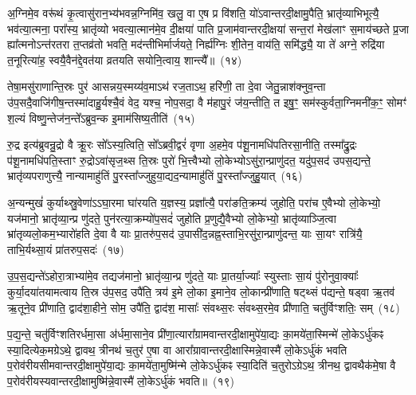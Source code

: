 अ॒ग्निमे॒व वरू॑थं कृ॒त्वासु॑रान॒भ्य॑भवन्न॒ग्निमि॑व॒ खलु॒ वा ए॒ष प्र वि॑शति॒ यो॑\-ऽवान्तरदी॒क्षामु॒पैति॒ भ्रातृ॑व्याभिभूत्यै॒ भव॑त्या॒त्मना॒ परा᳚स्य॒ भ्रातृ॑व्यो भवत्या॒त्मान॑मे॒व दी॒क्षया॑ पाति प्र॒जाम॑वान्तरदी॒क्षया॑ सन्त॒रां मेख॑लाꣳ स॒माय॑च्छते प्र॒जा ह्या᳚त्मनो\-ऽन्त॑रतरा त॒प्तव्र॑तो भवति॒ मद॑न्तीभिर्मार्जयते॒ निर्\mbox{}ह्य॑ग्निः शी॒तेन॒ वाय॑ति॒ समि॑द्ध्यै॒ या ते॑ अग्ने॒ रुद्रि॑या त॒नूरित्या॑ह॒ स्वयै॒वैन॑द्दे॒वत॑या व्रतयति सयोनि॒त्वाय॒ शान्त्यै᳚॥~(१४)\ip

{\anuvakamend[{यो वा ओज॑ आह॒ यद॑शी॒येति॒ ते᳚\-ऽग्न॒ एका॑\-दश च}]}

तेषा॒मसु॑राणान्ति॒स्रः पुर॑ आसन्नय॒स्मय्य॑व॒मा\-ऽथ॑ रज॒ता\-ऽथ॒ हरि॑णी॒ ता दे॒वा जेतु॒न्नाश॑क्नुव॒न्ता उ॑प॒सदै॒वाजि॑गीष॒न्तस्मा॑दाहु॒र्यश्चै॒वं वेद॒ यश्च॒ नोप॒सदा॒ वै म॑हापु॒रं ज॑य॒न्तीति॒ त इषु॒ꣳ॒ सम॑स्कुर्वता॒ग्निमनी॑क॒ꣳ॒ सोमꣳ॑ श॒ल्यं विष्णु॒न्तेज॑न॒न्ते᳚\-ऽब्रुव॒न्क इ॒माम॑सिष्य॒तीति॑~(१५)\ip

रु॒द्र इत्य॑ब्रुवन्रु॒द्रो वै क्रू॒रः सो᳚\-ऽस्य॒त्विति॒ सो᳚\-ऽब्रवी॒द्वरं॑ वृणा अ॒हमे॒व प॑शू॒नामधि॑\-पतिरसा॒नीति॒ तस्मा᳚द्\-रु॒द्रः प॑शू॒नामधि॑\-पति॒स्ताꣳ रु॒द्रो\-ऽवा॑सृज॒थ्स ति॒स्रः पुरो॑ भि॒त्त्वैभ्यो लो॒केभ्यो\-ऽसु॑रा॒न्प्राणु॑दत॒ यदु॑प॒सद॑ उपस॒द्यन्ते॒ भ्रातृ॑व्यपराणुत्त्यै॒ नान्यामाहु॑तिं पु॒रस्ता᳚ज्जुहुया॒द्यद॒न्यामाहु॑तिं पु॒रस्ता᳚ज्जुहु॒यात्~(१६)\ip

अ॒न्यन्मुखं॑ कुर्याथ्स्रु॒वेणा॑\-ऽऽघा॒रमा घा॑रयति य॒ज्ञस्य॒ प्रज्ञा᳚त्यै॒ परा॑ङति॒क्रम्य॑ जुहोति॒ परा॑च ए॒वैभ्यो लो॒केभ्यो॒ यज॑मानो॒ भ्रातृ॑व्या॒न्प्र णु॑दते॒ पुन॑रत्या॒क्रम्यो॑प॒सदं॑ जुहोति प्र॒णुद्यै॒वैभ्यो लो॒केभ्यो॒ भ्रातृ॑व्याञ्जि॒त्वा भ्रा॑तृव्यलो॒कम॒भ्यारो॑हति दे॒वा वै याः प्रा॒तरु॑प॒सद॑ उ॒पासी॑द॒न्नह्न॒स्ताभि॒रसु॑रा॒न्प्राणु॑दन्त॒ याः सा॒यꣳ रात्रि॑यै॒ ताभि॒र्यथ्सा॒यं प्रा॑तरुप॒सदः॑~(१७)\ip

उ॒प॒स॒द्यन्ते॑\-ऽहोरा॒त्राभ्या॑मे॒व तद्यज॑मानो॒ भ्रातृ॑व्या॒न्प्र णु॑दते॒ याः प्रा॒तर्या॒ज्याः᳚ स्युस्ताः सा॒यं पु॑रोनुवा॒क्याः᳚ कुर्या॒दया॑तयामत्वाय ति॒स्र उ॑प॒सद॒ उपै॑ति॒ त्रय॑ इ॒मे लो॒का इ॒माने॒व लो॒कान्प्री॑णाति॒ षट्थ्सं प॑द्यन्ते॒ षड्वा ऋ॒तव॑ ऋ॒तूने॒व प्री॑णाति॒ द्वाद॑शा॒हीने॒ सोम॒ उपै॑ति॒ द्वाद॑श॒ मासाः᳚ संवथ्स॒रः सं॑वथ्स॒रमे॒व प्री॑णाति॒ चतु॑र्विꣳशतिः॒ सम्~(१८)\ip

प॒द्य॒न्ते॒ चतु॑र्विꣳशतिरर्धमा॒सा अ॑र्धमा॒साने॒व प्री॑णा॒त्यारा᳚ग्रामवान्तरदी॒क्षामुपे॑या॒द्यः का॒मये॑ता॒स्मिन्मे॑ लो॒के\-ऽर्धु॑कꣴ स्या॒दित्येक॒मग्रे\-ऽथे॒ द्वावथ॒ त्रीनथ॑ च॒तुर॑ ए॒षा वा आरा᳚ग्रावान्तरदी॒क्षास्मिन्ने॒वास्मै॑ लो॒के\-ऽर्धु॑कं भवति प॒रोव॑रीयसीमवान्तरदी॒क्षामुपे॑या॒द्यः का॒मये॑ता॒मुष्मि॑न्मे लो॒के\-ऽर्धु॑कꣴ स्या॒दिति॑ च॒तुरो\-ऽग्रे\-ऽथ॒ त्रीनथ॒ द्वावथैक॑मे॒षा वै प॒रोव॑रीयस्यवान्तरदी॒क्षामुष्मि॑न्ने॒वास्मै॑ लो॒के\-ऽर्धु॑कं भवति॥~(१९)\ip

